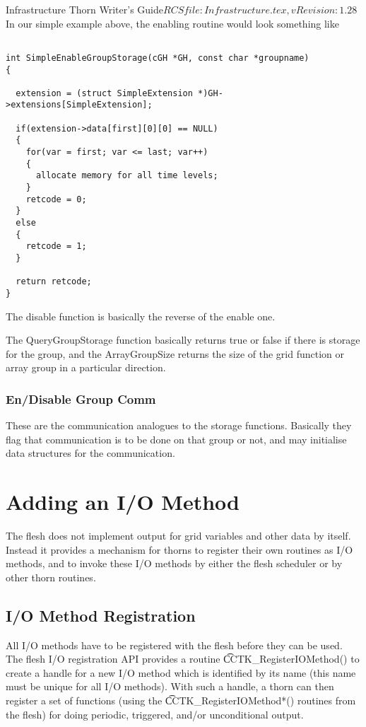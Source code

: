 \begin{cactuspart}{4}{Infrastructure Thorn Writer's Guide}{$RCSfile: Infrastructure.tex,v $}{$Revision: 1.28 $}
In our simple example above, the enabling routine would look 
something like

\begin{verbatim}

int SimpleEnableGroupStorage(cGH *GH, const char *groupname)
{

  extension = (struct SimpleExtension *)GH->extensions[SimpleExtension];

  if(extension->data[first][0][0] == NULL)
  {
    for(var = first; var <= last; var++)
    {
      allocate memory for all time levels;
    }
    retcode = 0;
  }
  else
  {
    retcode = 1;
  }

  return retcode;
}

\end{verbatim}

The disable function is basically the reverse of the enable one.

The QueryGroupStorage function basically returns true or false if there is storage
for the group, and the ArrayGroupSize returns the size of the grid function or array
group in a particular direction.

\subsection{En/Disable Group Comm}

These are the communication analogues to the storage functions.  Basically they flag
that communication is to be done on that group or not, and may initialise data 
structures for the communication.



\chapter{Adding an I/O Method}
\label{chap:io_methods}
%
The flesh does not implement output for grid variables and other data by itself.
Instead it provides a mechanism for thorns to register their own
routines as I/O methods, and to invoke these I/O methods by either the
flesh scheduler or by other thorn routines.
%
\section{I/O Method Registration}
%
All I/O methods have to be registered with the flesh before they can be used.\\
The flesh I/O registration API provides a routine {\t CCTK\_RegisterIOMethod()}
to create a handle for a new I/O method which is identified by its name
(this name must be unique for all I/O methods).
With such a handle, a thorn can then register a set of functions (using the
{\t CCTK\_RegisterIOMethod*()} routines from the flesh) for doing
periodic, triggered, and/or unconditional output.


\end{cactuspart}
